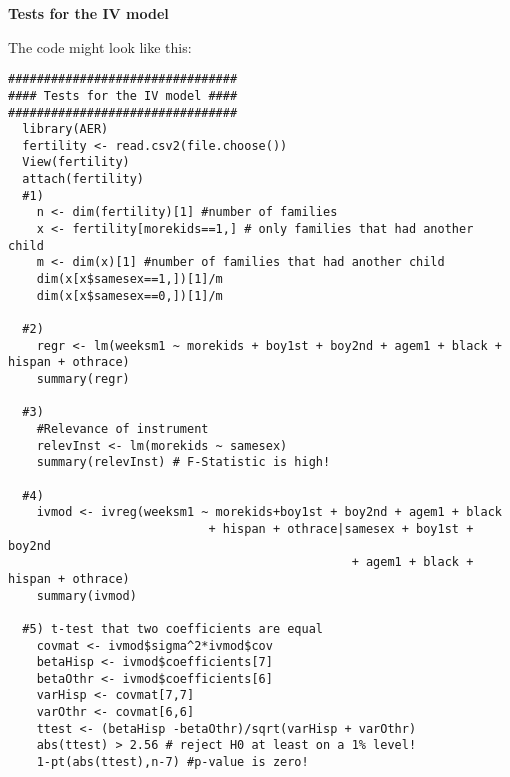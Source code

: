 \begin{Solution}{13.6}
\textbf{Tests for the IV model}

The code might look like this:
\begin{verbatim}
################################
#### Tests for the IV model ####
################################
  library(AER)
  fertility <- read.csv2(file.choose())
  View(fertility)
  attach(fertility)
  #1)
    n <- dim(fertility)[1] #number of families
    x <- fertility[morekids==1,] # only families that had another child
    m <- dim(x)[1] #number of families that had another child
    dim(x[x$samesex==1,])[1]/m
    dim(x[x$samesex==0,])[1]/m

  #2)
    regr <- lm(weeksm1 ~ morekids + boy1st + boy2nd + agem1 + black + hispan + othrace)
    summary(regr)

  #3)
    #Relevance of instrument
    relevInst <- lm(morekids ~ samesex)
    summary(relevInst) # F-Statistic is high!

  #4)
    ivmod <- ivreg(weeksm1 ~ morekids+boy1st + boy2nd + agem1 + black
                            + hispan + othrace|samesex + boy1st + boy2nd
                                                + agem1 + black + hispan + othrace)
    summary(ivmod)

  #5) t-test that two coefficients are equal
    covmat <- ivmod$sigma^2*ivmod$cov
    betaHisp <- ivmod$coefficients[7]
    betaOthr <- ivmod$coefficients[6]
    varHisp <- covmat[7,7]
    varOthr <- covmat[6,6]
    ttest <- (betaHisp -betaOthr)/sqrt(varHisp + varOthr)
    abs(ttest) > 2.56 # reject H0 at least on a 1% level!
    1-pt(abs(ttest),n-7) #p-value is zero!


\end{verbatim}
\end{Solution}

